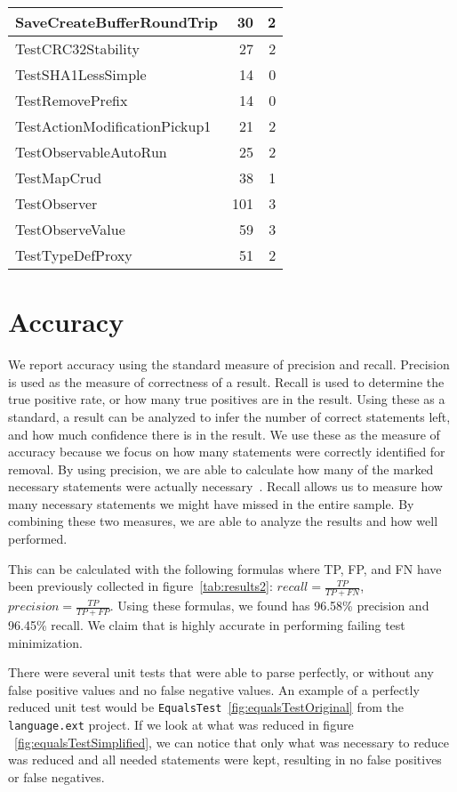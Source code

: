 \begin{table}
\begin{center}
{\begin{tabular}{|l|r|r|}
\hline
{SaveCreateBufferRoundTrip} & 30 & 2 \\
\hline
{TestCRC32Stability} & 27 & 2 \\
\hline
{TestSHA1LessSimple} & 14 & 0 \\
\hline
{TestRemovePrefix} & 14 & 0 \\
\hline
{TestActionModificationPickup1} & 21 & 2 \\
\hline
{TestObservableAutoRun} & 25 & 2 \\
\hline
{TestMapCrud} & 38 & 1 \\
\hline
{TestObserver} & 101 & 3 \\
\hline
{TestObserveValue} & 59 & 3 \\
\hline
{TestTypeDefProxy} & 51 & 2 \\
\hline

\end{tabular}
}
\end{center}
\label{tab:results3}
\end{table}


\section{Accuracy}
We report accuracy using the standard measure of precision and recall. Precision is used as the measure of correctness of a result. Recall is used to determine the true positive rate, or how many true positives are in the result. Using these as a standard, a result can be analyzed to infer the number of correct statements left, and how much confidence there is in the result. We use these as the measure of accuracy because we focus on how many statements were correctly identified for removal. By using precision, we are able to calculate how many of the marked necessary statements were actually necessary~\cite{santos_2021}. Recall allows us to measure how many necessary statements we might have missed in the entire sample. By combining these two measures, we are able to analyze the results and how well \mytool performed.

This can be calculated with the following formulas where TP, FP, and FN have been previously collected in figure~\ref{tab:results2}: $recall = \frac{TP}{TP + FN}$, $precision = \frac{TP}{TP+FP}$. Using these formulas, we found \mytool has 96.58\% precision and 96.45\% recall. We claim that \mytool is highly accurate in performing failing test minimization. 

There were several unit tests that were able to parse perfectly, or without any false positive values and no false negative values. An example of a perfectly reduced unit test would be \texttt{EqualsTest}~\ref{fig:equalsTestOriginal} from the \texttt{language.ext} project. If we look at what was reduced in figure ~\ref{fig:equalsTestSimplified}, we can notice that only what was necessary to reduce was reduced and all needed statements were kept, resulting in no false positives or false negatives.


